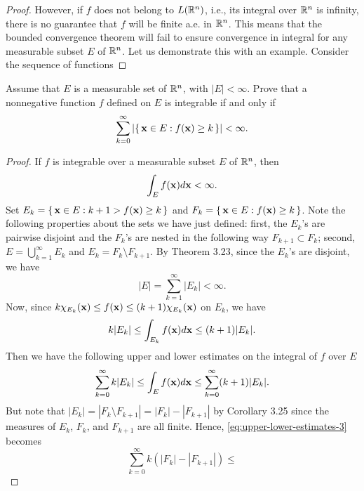 \begin{proof}
However, if $f$ does not belong to $L(\mathbb{R}^n)$, i.e., its integral over
$\mathbb{R}^n$ is infinity, there is no guarantee that $f$ will be finite a.e.\@
in $\mathbb{R}^n$. This means that the bounded convergence theorem will fail to
ensure convergence in integral for any measurable subset $E$ of
$\mathbb{R}^n$. Let us demonstrate this with an example. Consider the sequence of
functions
\end{proof}

\begin{problem}
Assume that $E$ is a measurable set of $\mathbb{R}^n$, with
$|E|<\infty$. Prove that a nonnegative function $f$ defined
on $E$ is integrable if and only if
\[
\sum_{k=0}^\infty\left|\left\{\,\mathbf{x}\in E:f(\mathbf{x})\geq
    k\,\right\}\right|<\infty.
\]
\end{problem}
\begin{proof}
If $f$ is integrable over a measurable subset $E$ of $\mathbb{R}^n$, then
\begin{equation}
\label{eq:integrability-3}
\int_E f(\mathbf{x}) d \mathbf{x}<\infty.
\end{equation}
Set $E_k=\left\{\,\mathbf{x}\in E:k+1>f(\mathbf{x})\geq k\,\right\}$ and
$F_k=\left\{\,\mathbf{x}\in E:f(\mathbf{x})\geq k\,\right\}$. Note the
following properties about the sets we have just defined: first, the
$E_k$'s are pairwise disjoint and the $F_k$'s are nested in the following
way $F_{k+1}\subset F_k$; second, $E=\bigcup_{k=1}^\infty E_k$ and
$E_k=F_k\setminus F_{k+1}$. By Theorem 3.23, since the $E_k$'s are disjoint,
we have
\begin{equation}
  \label{eq:disjoint-measurable-sets-3}
|E|=\sum_{k=1}^\infty|E_k|<\infty.
\end{equation}
Now, since $k\chi_{E_k}(\mathbf{x})\leq f(\mathbf{x})\leq (k+1)\chi_{E_k}(\mathbf{x})$ on
$E_k$, we have
\begin{equation}
\label{eq:estimates-E-k-3}
k|E_k|\leq\int_{E_k}f(\mathbf{x}) d \mathbf{x}\leq (k+1)|E_k|.
\end{equation}
Then we have the following upper and lower estimates on the integral of $f$
over $E$
\begin{equation}
\label{eq:upper-lower-estimates-3}
\sum_{k=0}^\infty k|E_k|\leq\int_E f(\mathbf{x}) d \mathbf{x}\leq\sum_{k=0}^\infty(k+1)|E_k|.
\end{equation}
But note that $|E_k|=|F_k\setminus F_{k+1}|=|F_k|-|F_{k+1}|$ by Corollary 3.25
since the measures of $E_k$, $F_k$, and $F_{k+1}$ are all finite. Hence,
\eqref{eq:upper-lower-estimates-3} becomes
\begin{equation}
\label{eq:new-upper-lower-estimates-3}
\sum_{k=0}^\infty k\left(|F_k|-|F_{k+1}|\right)\leq

\end{equation}
\end{proof}
